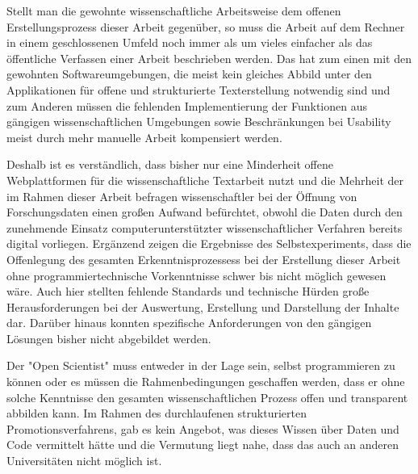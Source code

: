 Stellt man die gewohnte wissenschaftliche Arbeitsweise dem offenen Erstellungsprozess dieser Arbeit gegenüber, so muss die Arbeit auf dem Rechner in einem geschlossenen Umfeld noch immer als um vieles einfacher als das öffentliche Verfassen einer Arbeit beschrieben werden. Das hat zum einen mit den gewohnten Softwareumgebungen, die meist kein gleiches Abbild unter den Applikationen für offene und  strukturierte Texterstellung notwendig sind und zum Anderen müssen die fehlenden Implementierung der Funktionen aus gängigen wissenschaftlichen Umgebungen sowie Beschränkungen bei Usability meist durch mehr manuelle Arbeit kompensiert werden.

Deshalb ist es verständlich, dass bisher nur eine Minderheit offene Webplattformen für die wissenschaftliche Textarbeit \cite{Perkel_2014} nutzt und die Mehrheit der im Rahmen dieser Arbeit befragen wissenschaftler bei der Öffnung von Forschungsdaten einen großen Aufwand befürchtet, obwohl die Daten durch den zunehmende Einsatz computerunterstützter wissenschaftlicher Verfahren bereits digital vorliegen. Ergänzend zeigen die Ergebnisse des Selbstexperiments, dass die Offenlegung des gesamten Erkenntnisprozessess bei der Erstellung dieser Arbeit ohne programmiertechnische Vorkenntnisse schwer bis nicht möglich gewesen wäre. Auch hier stellten fehlende Standards und technische Hürden große Herausforderungen bei der Auswertung, Erstellung und Darstellung der Inhalte dar. Darüber hinaus konnten spezifische Anforderungen von den gängigen Lösungen bisher nicht abgebildet werden.

Der "Open Scientist" muss entweder in der Lage sein, selbst programmieren zu können oder es müssen die Rahmenbedingungen geschaffen werden, dass er ohne solche Kenntnisse den gesamten wissenschaftlichen Prozess offen und transparent abbilden kann. Im Rahmen des durchlaufenen strukturierten Promotionsverfahrens, gab es kein Angebot, was dieses Wissen über Daten und Code vermittelt hätte und die Vermutung liegt nahe, dass das auch an anderen Universitäten nicht möglich ist.


